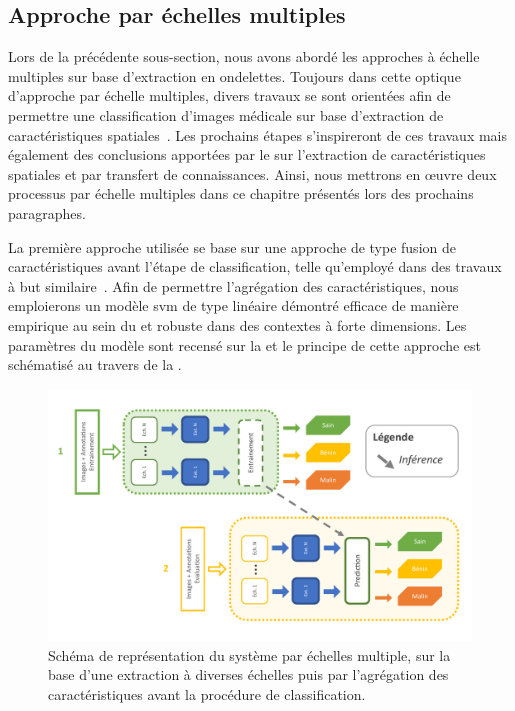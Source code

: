 \subsection{Approche par échelles multiples}
Lors de la précédente sous-section, nous avons abordé les approches à échelle multiples sur base d'extraction en ondelettes. Toujours dans cette optique d'approche par échelle multiples, divers travaux se sont orientées afin de permettre une classification d'images médicale sur base d'extraction de caractéristiques spatiales~\cite{Alsaih2016,Tzalavra2016}. Les prochains étapes s'inspireront de ces travaux mais également des conclusions apportées par le  sur l'extraction de caractéristiques spatiales et par transfert de connaissances. Ainsi, nous mettrons en œuvre deux processus par échelle multiples dans ce chapitre présentés lors des prochains paragraphes.\par

La première approche utilisée se base sur une approche de type fusion de caractéristiques avant l'étape de classification, telle qu'employé dans des travaux à but similaire~\cite{Pedersoli2011,Alsaih2016}. Afin de permettre l'agrégation des caractéristiques, nous emploierons un modèle \gls{svm} de type linéaire démontré efficace de manière empirique au sein du  et robuste dans des contextes à forte dimensions. Les paramètres du modèle sont recensé sur la  et le principe de cette approche est schématisé au travers de la .\par

\begin{figure}[H]
    \centering
    \includegraphics[width=\linewidth]{contents/chapter_5/resources/scheme_multiscale_features.pdf}
    \caption{Schéma de représentation du système par échelles multiple, sur la base d'une extraction à diverses échelles puis par l'agrégation des caractéristiques avant la procédure de classification.}
    \label{fig:scheme_multiscale_features}
\end{figure}\par

